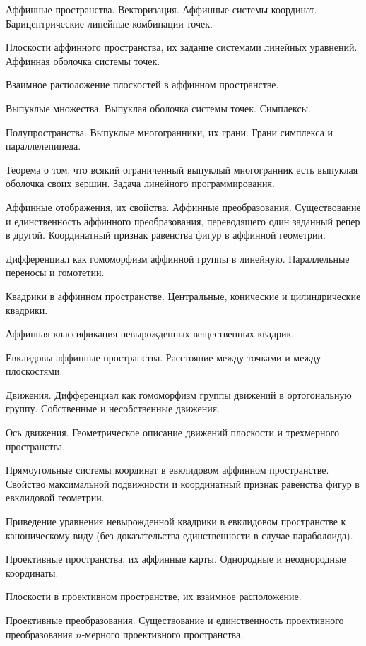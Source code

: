\documentclass[a4paper]{article}
\begin{document}
\begin{nums}{-1}
\item Аффинные пространства. Векторизация. Аффинные системы координат. Барицентрические линейные комбинации точек.
\item Плоскости аффинного пространства, их задание системами линейных уравнений. Аффинная оболочка системы точек.
\item Взаимное расположение плоскостей в аффинном пространстве.
\item Выпуклые множества. Выпуклая оболочка системы точек. Симплексы.
\item Полупространства. Выпуклые многогранники, их грани. Грани симплекса и параллелепипеда.
\item Теорема о том, что всякий ограниченный выпуклый многогранник есть выпуклая оболочка своих вершин. Задача линейного программирования.
\item Аффинные отображения, их свойства. Аффинные преобразования. Существование и единственность аффинного преобразования,
переводящего один заданный репер в другой. Координатный признак равенства фигур в аффинной геометрии.
\item Дифференциал как гомоморфизм аффинной группы в линейную. Параллельные переносы и гомотетии.
\item Квадрики в аффинном пространстве. Центральные, конические и цилиндрические квадрики.
\item Аффинная классификация невырожденных вещественных квадрик.
\item Евклидовы аффинные пространства. Расстояние между точками и между плоскостями.
\item Движения. Дифференциал как гомоморфизм группы движений в ортогональную группу. Собственные и несобственные движения.
\item Ось движения. Геометрическое описание движений плоскости и трехмерного пространства.
\item Прямоугольные системы координат в евклидовом аффинном пространстве. Свойство максимальной подвижности и координатный
признак равенства фигур в евклидовой геометрии.
\item Приведение уравнения невырожденной квадрики в евклидовом пространстве к каноническому
виду (без доказательства единственности в случае параболоида).
\item Проективные пространства, их аффинные карты. Однородные и неоднородные координаты.
\item Плоскости в проективном пространстве, их взаимное расположение.
\item Проективные преобразования. Существование и единственность проективного преобразования $n$-мерного проективного пространства,

\end{nums}
\end{document}
